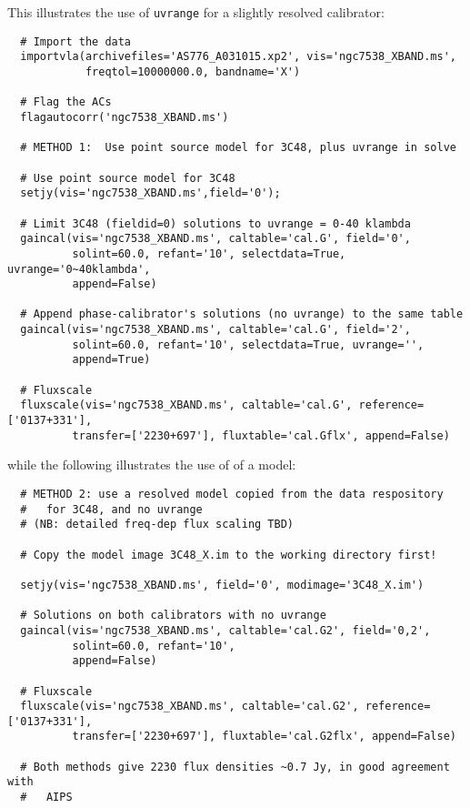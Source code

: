 This illustrates the use of {\tt uvrange} for a slightly resolved 
calibrator:
\small
\begin{verbatim}
  # Import the data
  importvla(archivefiles='AS776_A031015.xp2', vis='ngc7538_XBAND.ms',
            freqtol=10000000.0, bandname='X')

  # Flag the ACs
  flagautocorr('ngc7538_XBAND.ms')

  # METHOD 1:  Use point source model for 3C48, plus uvrange in solve

  # Use point source model for 3C48
  setjy(vis='ngc7538_XBAND.ms',field='0');

  # Limit 3C48 (fieldid=0) solutions to uvrange = 0-40 klambda
  gaincal(vis='ngc7538_XBAND.ms', caltable='cal.G', field='0',
          solint=60.0, refant='10', selectdata=True, uvrange='0~40klambda', 
          append=False)

  # Append phase-calibrator's solutions (no uvrange) to the same table
  gaincal(vis='ngc7538_XBAND.ms', caltable='cal.G', field='2', 
          solint=60.0, refant='10', selectdata=True, uvrange='', 
          append=True)

  # Fluxscale
  fluxscale(vis='ngc7538_XBAND.ms', caltable='cal.G', reference=['0137+331'],
          transfer=['2230+697'], fluxtable='cal.Gflx', append=False)
\end{verbatim}
\normalsize
while the following illustrates the use of of a model:
\small
\begin{verbatim}
  # METHOD 2: use a resolved model copied from the data respository
  #   for 3C48, and no uvrange
  # (NB: detailed freq-dep flux scaling TBD)

  # Copy the model image 3C48_X.im to the working directory first!

  setjy(vis='ngc7538_XBAND.ms', field='0', modimage='3C48_X.im')

  # Solutions on both calibrators with no uvrange
  gaincal(vis='ngc7538_XBAND.ms', caltable='cal.G2', field='0,2',
          solint=60.0, refant='10', 
          append=False)

  # Fluxscale
  fluxscale(vis='ngc7538_XBAND.ms', caltable='cal.G2', reference=['0137+331'],
          transfer=['2230+697'], fluxtable='cal.G2flx', append=False)

  # Both methods give 2230 flux densities ~0.7 Jy, in good agreement with
  #   AIPS
\end{verbatim}
\normalsize


